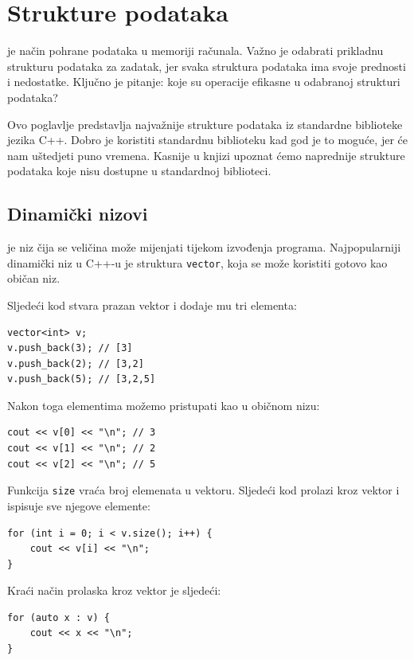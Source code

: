 \chapter{Strukture podataka}


 je način pohrane
podataka u memoriji računala.
Važno je odabrati prikladnu
strukturu podataka za zadatak,
jer svaka struktura podataka ima svoje
prednosti i nedostatke.
Ključno je pitanje: koje su operacije
efikasne u odabranoj strukturi podataka?

Ovo poglavlje predstavlja najvažnije
strukture podataka iz standardne biblioteke jezika C++.
Dobro je koristiti standardnu biblioteku
kad god je to moguće,
jer će nam uštedjeti puno vremena.
Kasnije u knjizi upoznat ćemo naprednije
strukture podataka koje nisu dostupne
u standardnoj biblioteci.

\section{Dinamički nizovi}


 je niz čija se
veličina može mijenjati tijekom izvođenja
programa.
Najpopularniji dinamički niz u C++-u je
struktura \texttt{vector},
koja se može koristiti gotovo kao običan niz.

Sljedeći kod stvara prazan vektor i
dodaje mu tri elementa:

\begin{lstlisting}
vector<int> v;
v.push_back(3); // [3]
v.push_back(2); // [3,2]
v.push_back(5); // [3,2,5]
\end{lstlisting}

Nakon toga elementima možemo pristupati kao u običnom nizu:

\begin{lstlisting}
cout << v[0] << "\n"; // 3
cout << v[1] << "\n"; // 2
cout << v[2] << "\n"; // 5
\end{lstlisting}

Funkcija \texttt{size} vraća broj elemenata u vektoru.
Sljedeći kod prolazi kroz
vektor i ispisuje sve njegove elemente:

\begin{lstlisting}
for (int i = 0; i < v.size(); i++) {
    cout << v[i] << "\n";
}
\end{lstlisting}

\begin{samepage}
Kraći način prolaska kroz vektor je sljedeći:

\begin{lstlisting}
for (auto x : v) {
    cout << x << "\n";
}
\end{lstlisting}
\end{samepage}

